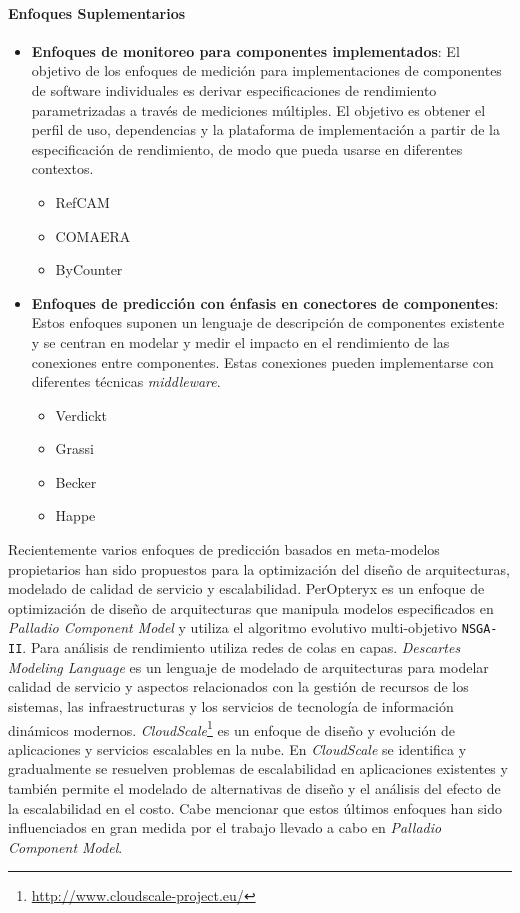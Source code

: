 \paragraph{Enfoques Suplementarios}
\begin{itemize}
    \item \textbf{Enfoques de monitoreo para componentes implementados}: El objetivo de los enfoques de medición para implementaciones de componentes de software individuales es derivar especificaciones de rendimiento parametrizadas a través de mediciones múltiples. El objetivo es obtener el perfil de uso, dependencias y la plataforma de implementación a partir de la especificación de rendimiento, de modo que pueda usarse en diferentes contextos. 
    \begin{itemize}
        \item RefCAM
        \item COMAERA
        \item ByCounter
    \end{itemize}
    \item \textbf{Enfoques de predicción con énfasis en conectores de componentes}: Estos enfoques suponen un lenguaje de descripción de componentes existente y se centran en modelar y medir el impacto en el rendimiento de las conexiones entre componentes. Estas conexiones pueden implementarse con diferentes técnicas \emph{middleware}.
    \begin{itemize}
        \item Verdickt
        \item Grassi
        \item Becker
        \item Happe
    \end{itemize}        
\end{itemize}

Recientemente varios enfoques de predicción basados en meta-modelos propietarios han sido propuestos para la optimización del diseño de arquitecturas, modelado de calidad de servicio y escalabilidad. PerOpteryx\cite{Koziolek:2011:PAA:2000259.2000267} es un enfoque de optimización de diseño de arquitecturas que manipula modelos especificados en \emph{Palladio Component Model}\cite{Reussner:2016:MSS:3036121} y utiliza el algoritmo evolutivo multi-objetivo \texttt{NSGA-II}. Para análisis de rendimiento utiliza redes de colas en capas. \emph{Descartes Modeling Language}\cite{KoBrHu2014-TechReport-DML} es un lenguaje de modelado de arquitecturas para modelar calidad de servicio y aspectos relacionados con la gestión de recursos de los sistemas, las infraestructuras y los servicios de tecnología de información dinámicos modernos. \emph{CloudScale}\footnote{\url{http://www.cloudscale-project.eu/}}\cite{Brataas:2013:CSM:2479871.2479920} es un enfoque de diseño y evolución de aplicaciones y servicios escalables en la nube. En \emph{CloudScale} se identifica y gradualmente se resuelven problemas de escalabilidad en aplicaciones existentes y también permite el modelado de alternativas de diseño y el análisis del efecto de la escalabilidad en el costo. Cabe mencionar que estos últimos enfoques han sido influenciados en gran medida por el trabajo llevado a cabo en \emph{Palladio Component Model}.

